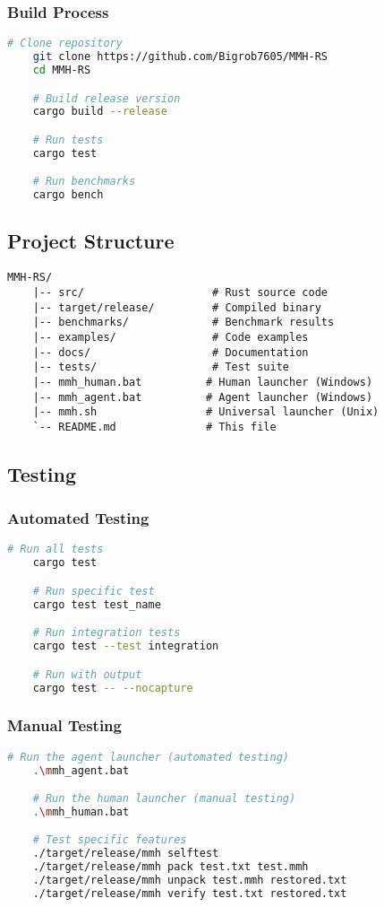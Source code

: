 \documentclass[11pt,a4paper]{article}
\begin{document}
	\subsubsection{Build Process}
	\begin{lstlisting}[language=bash]
	# Clone repository
	git clone https://github.com/Bigrob7605/MMH-RS
	cd MMH-RS

	# Build release version
	cargo build --release

	# Run tests
	cargo test

	# Run benchmarks
	cargo bench
	\end{lstlisting}

	\subsection{Project Structure}
	\begin{lstlisting}[basicstyle=\ttfamily\small]
	MMH-RS/
	|-- src/                    # Rust source code
	|-- target/release/         # Compiled binary
	|-- benchmarks/             # Benchmark results
	|-- examples/               # Code examples
	|-- docs/                   # Documentation
	|-- tests/                  # Test suite
	|-- mmh_human.bat          # Human launcher (Windows)
	|-- mmh_agent.bat          # Agent launcher (Windows)
	|-- mmh.sh                 # Universal launcher (Unix)
	`-- README.md              # This file
	\end{lstlisting}

	\subsection{Testing}

	\subsubsection{Automated Testing}
	\begin{lstlisting}[language=bash]
	# Run all tests
	cargo test

	# Run specific test
	cargo test test_name

	# Run integration tests
	cargo test --test integration

	# Run with output
	cargo test -- --nocapture
	\end{lstlisting}

	\subsubsection{Manual Testing}
	\begin{lstlisting}[language=bash]
	# Run the agent launcher (automated testing)
	.\mmh_agent.bat

	# Run the human launcher (manual testing)
	.\mmh_human.bat

	# Test specific features
	./target/release/mmh selftest
	./target/release/mmh pack test.txt test.mmh
	./target/release/mmh unpack test.mmh restored.txt
	./target/release/mmh verify test.txt restored.txt
	\end{lstlisting}
\end{document}

